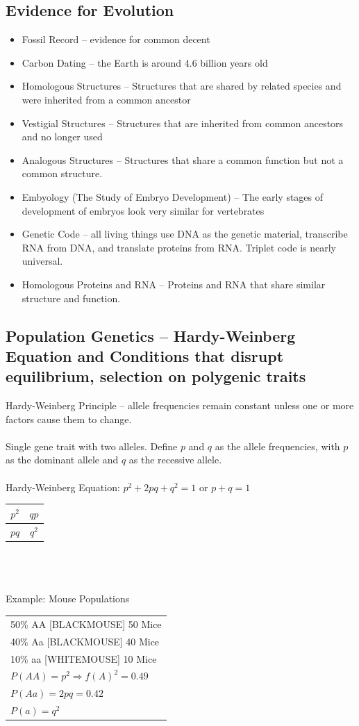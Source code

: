 \documentclass{article}
\begin{document}
\subsection{Evidence for Evolution}
\begin{itemize}
\item Fossil Record -- evidence for common decent
\item Carbon Dating -- the Earth is around 4.6 billion years old
\item Homologous Structures -- Structures that are shared by related species and were inherited from a common ancestor
\item Vestigial Structures -- Structures that are inherited from common ancestors and no longer used
\item Analogous Structures -- Structures that share a common function but not a common structure.
\item Embyology (The Study of Embryo Development) -- The early stages of development of embryos look very similar for vertebrates
\item Genetic Code -- all living things use DNA as the genetic material, transcribe RNA from DNA, and translate proteins from RNA. Triplet code is nearly universal.
\item Homologous Proteins and RNA -- Proteins and RNA that share similar structure and function.
\end{itemize}

\subsection{Population Genetics -- Hardy-Weinberg Equation and Conditions that disrupt equilibrium, selection on polygenic traits}
Hardy-Weinberg Principle -- allele frequencies remain constant unless one or more factors cause them to change.\\
\\
Single gene trait with two alleles. Define $p$ and $q$ as the allele frequencies, with $p$ as the dominant allele and $q$ as the recessive allele.\\
\\
Hardy-Weinberg Equation: $p^{2}+2pq+q^{2}=1$ or $p+q=1$\\

\begin{tabular}{| c | c |}
\hline
$p^{2}$ & $qp$\\
\hline
$pq$ & $q^{2}$\\
\hline
\end{tabular}
\\
\\
\\
Example: Mouse Populations\\
\begin{tabular}{|p{10cm}}
50\% AA [BLACKMOUSE] 50 Mice\\
40\% Aa [BLACKMOUSE] 40 Mice\\
10\% aa [WHITEMOUSE] 10 Mice\\
$P(AA)=p^{2}\Rightarrow f(A)^{2}=0.49$\\
$P(Aa)=2pq=0.42$\\
$P(a)=q^{2}$\\
\end{tabular}
\end{document}
